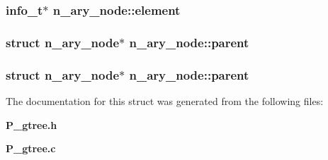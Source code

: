 \subsubsection{\setlength{\rightskip}{0pt plus 5cm}info\_\-t$\ast$ n\_\-ary\_\-node::element}\label{structn__ary__node_m0}


\subsubsection{\setlength{\rightskip}{0pt plus 5cm}struct n\_\-ary\_\-node$\ast$ n\_\-ary\_\-node::parent}\label{structn__ary__node_m5}


\subsubsection{\setlength{\rightskip}{0pt plus 5cm}struct n\_\-ary\_\-node$\ast$ n\_\-ary\_\-node::parent}\label{structn__ary__node_m2}




The documentation for this struct was generated from the following files:\begin{CompactItemize}
\item 
{\bf P\_\-gtree.h}\item 
{\bf P\_\-gtree.c}\end{CompactItemize}
